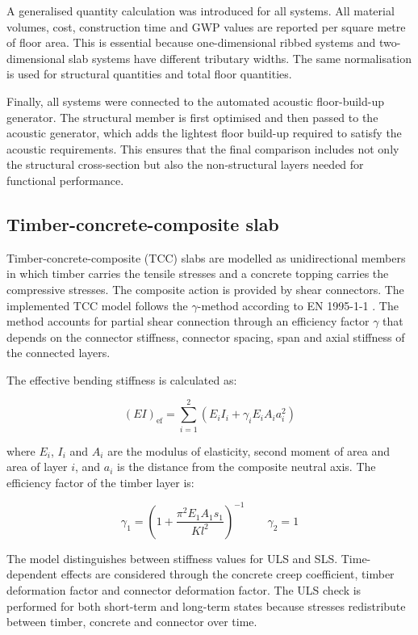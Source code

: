 \noindent A generalised quantity calculation was introduced for all systems. All material volumes, cost, construction time and GWP values are reported per square metre of floor area. This is essential because one-dimensional ribbed systems and two-dimensional slab systems have different tributary widths. The same normalisation is used for structural quantities and total floor quantities.

\noindent Finally, all systems were connected to the automated acoustic floor-build-up generator. The structural member is first optimised and then passed to the acoustic generator, which adds the lightest floor build-up required to satisfy the acoustic requirements. This ensures that the final comparison includes not only the structural cross-section but also the non-structural layers needed for functional performance.

\subsection{Timber-concrete-composite slab}

Timber-concrete-composite (TCC) slabs are modelled as unidirectional members in which timber carries the tensile stresses and a concrete topping carries the compressive stresses. The composite action is provided by shear connectors. The implemented TCC model follows the $\gamma$-method according to EN 1995-1-1 \cite{Eurocode5_2023}. The method accounts for partial shear connection through an efficiency factor $\gamma$ that depends on the connector stiffness, connector spacing, span and axial stiffness of the connected layers.

\noindent The effective bending stiffness is calculated as:

\[
    (EI)_{\mathrm{ef}}
    =
    \sum_{i=1}^{2}
    \left(
        E_i I_i
        +
        \gamma_i E_i A_i a_i^2
    \right)
\]

\noindent where $E_i$, $I_i$ and $A_i$ are the modulus of elasticity, second moment of area and area of layer $i$, and $a_i$ is the distance from the composite neutral axis. The efficiency factor of the timber layer is:

\[
    \gamma_1 =
    \left(
        1+
        \frac{\pi^2 E_1 A_1 s_1}{K l^2}
    \right)^{-1}
    \qquad
    \gamma_2 = 1
\]

\noindent The model distinguishes between stiffness values for ULS and SLS. Time-dependent effects are considered through the concrete creep coefficient, timber deformation factor and connector deformation factor. The ULS check is performed for both short-term and long-term states because stresses redistribute between timber, concrete and connector over time.

